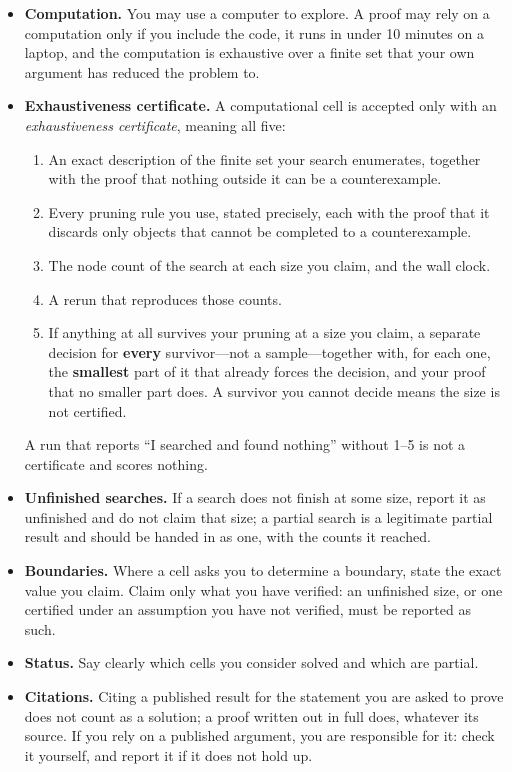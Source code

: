 \documentclass[11pt]{article}
\theoremstyle{definition}
\begin{document}
\begin{itemize}[leftmargin=*]
  \item \textbf{Computation.}
    You may use a computer to explore. A proof may rely on a
    computation only if you include the code, it runs in under
    10 minutes on a laptop, and the computation is exhaustive over a
    finite set that your own argument has reduced the problem to.
  \item \textbf{Exhaustiveness certificate.}
    A computational cell is accepted only with an
    \emph{exhaustiveness certificate}, meaning all five:
    \begin{enumerate}[leftmargin=*]
      \item An exact description of the finite set your search
        enumerates, together with the proof that nothing outside it
        can be a counterexample.
      \item Every pruning rule you use, stated precisely, each with
        the proof that it discards only objects that cannot be
        completed to a counterexample.
      \item The node count of the search at each size you claim, and
        the wall clock.
      \item A rerun that reproduces those counts.
      \item If anything at all survives your pruning at a size you
        claim, a separate decision for \textbf{every} survivor---not a
        sample---together with, for each one, the \textbf{smallest}
        part of it that already forces the decision, and your proof
        that no smaller part does. A survivor you cannot decide means
        the size is not certified.
    \end{enumerate}
    A run that reports ``I searched and found nothing'' without 1--5
    is not a certificate and scores nothing.
  \item \textbf{Unfinished searches.}
    If a search does not finish at some size, report it as unfinished
    and do not claim that size; a partial search is a legitimate
    partial result and should be handed in as one, with the counts it
    reached.
  \item \textbf{Boundaries.}
    Where a cell asks you to determine a boundary, state the exact
    value you claim. Claim only what you have verified: an unfinished
    size, or one certified under an assumption you have not verified,
    must be reported as such.
  \item \textbf{Status.}
    Say clearly which cells you consider solved and which are
    partial.
  \item \textbf{Citations.}
    Citing a published result for the statement you are asked to
    prove does not count as a solution; a proof written out in full
    does, whatever its source. If you rely on a published argument,
    you are responsible for it: check it yourself, and report it if
    it does not hold up.
\end{itemize}
\end{document}
